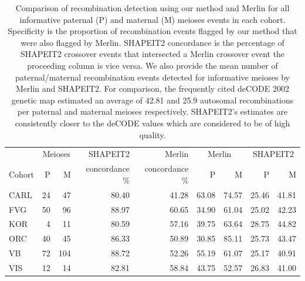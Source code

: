 \begin{table}
\begin{center}
\begin{tabular}{|l|rr|rr|rr|rr|}
  \hline 
  & \multicolumn{2}{c|}{Meioses}   & SHAPEIT2   & Merlin  & \multicolumn{2}{c|}{Merlin} & \multicolumn{2}{c|}{SHAPEIT2} \\
  Cohort & P & M & concordance \% & concordance \% & P & M & P & M\\

    \hline
    CARL & 24 & 47 & 80.40 & 41.28 & 63.08 & 74.57 & 25.46 & 41.81 \\ 
    FVG & 50 & 96 & 88.97 & 60.65 & 34.90 & 61.04 & 25.02 & 42.23 \\ 
    KOR & 4 & 11 & 80.59 & 57.16 & 39.75 & 63.64 & 28.75 & 44.82 \\ 
    ORC & 40 & 45 & 86.33 & 50.89 & 30.85 & 85.11 & 25.73 & 43.47 \\ 
    VB & 72 & 104 & 88.72 & 52.26 & 55.19 & 61.07 & 25.17 & 40.91 \\ 
    VIS & 12 & 14 & 82.81 & 58.84 & 43.75 & 52.57 & 26.83 & 41.00 \\ 
    \hline
  \end{tabular}
\end{center}

\caption[Summary of crossover events detected by DuoHMM and Merlin in real data]{Comparison of recombination detection using our  method and Merlin for all informative paternal (P) and maternal (M) meioses events in each cohort. Specificity is the proportion of recombination events flagged by our method that were also flagged by Merlin. SHAPEIT2 concordance is the percentage of SHAPEIT2 crossover events that intersected a Merlin crossover event the proceeding column is vice versa. We also provide the mean number of paternal/maternal recombination events detected for informative meioses by Merlin and SHAPEIT2. For comparison, the frequently cited deCODE 2002 genetic map estimated an average of  42.81 and 25.9 autosomal recombinations per paternal and maternal meioses respectively.  SHAPEIT2's estimates are consistently closer to the deCODE values which are considered to be of high quality.  \label{tab:pedtab2}}
\end{table}

